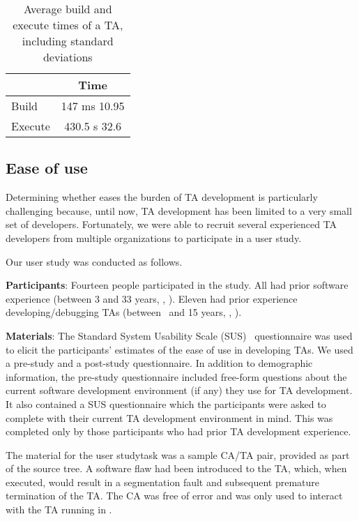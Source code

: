 \documentclass[10pt,conference,letterpaper]{IEEEtran}
\newif\ifabridged
\newif\ifnotabridged
\newcommand{\opentee}{\protect{TEE-Vi}\xspace}
\newcommand{\opentee}{\protect{Open-TEE}\xspace}
\begin{document}
\begin{table}
\centering
\caption{Average build and execute times of a TA, including standard deviations}
\label{tab:performance}
\begin{tabular}{l c}
  & Time \\
  \hline
  Build & 147 ms  10.95 \\
  \rowcolor{black!15} \cellcolor{black!15}Execute & 430.5 s  32.6 \\
\hline
\end{tabular}
\end{table}
 \subsection{Ease of use}
\label{user-study}

Determining whether \opentee eases the burden of TA development is particularly
challenging because, until now, TA development has been limited to a very small
set of developers. Fortunately, we were able to recruit several experienced TA
developers from multiple organizations to participate in a user
study.
\ifabridged
Fourteen people participated in the study. Eleven had prior experience
developing/debugging TAs. We used a pre-study and a post-study
Standard System Usability Scale
(SUS)~\cite{bookchapter:sus,jour:BKM08} questionnaire to
elicit the participants' estimates of the ease of use in developing
TAs. They were asked to complete the pre-study SUS questionnaire with
their current TA software development environment in mind and the
post-study SUS questionnaire with \opentee in mind.
See the full version of this paper~\cite{MDNA15} for a complete
description of the user study.
\else
Our user study was conducted as follows.

\noindent\textbf{Participants}: Fourteen people participated in the
study. All had prior software experience (between 3 and 33 years,
, ). Eleven had prior experience developing/debugging
TAs (between \textonehalf\ and 15 years, , ).

\noindent\textbf{Materials}: The Standard System Usability Scale
(SUS)~\cite{bookchapter:sus,jour:BKM08} questionnaire was used to
elicit the participants' estimates of the ease of use in developing
TAs. We used a pre-study and a post-study questionnaire. In addition
to demographic information, the pre-study questionnaire included
free-form questions about the current software development environment
(if any) they use for TA development.  It also contained a SUS
questionnaire which the participants were asked to complete with their
current TA development environment in mind. This was completed only
by those participants who had prior TA development experience.
\fi
The material for the user study\footnotemark task was a sample CA/TA
pair, provided as part of the \opentee source tree. A software flaw
had been introduced to the TA, which, when executed, would result in a
segmentation fault and subsequent premature termination of the TA. The
CA was free of error and was only used to interact with the TA running
in \opentee.
\ifnotabridged
Code complexity metrics for the TA used in the user study are shown in
Table~\ref{tbl:user-study-ta-metrics}.
\fi
\end{document}
